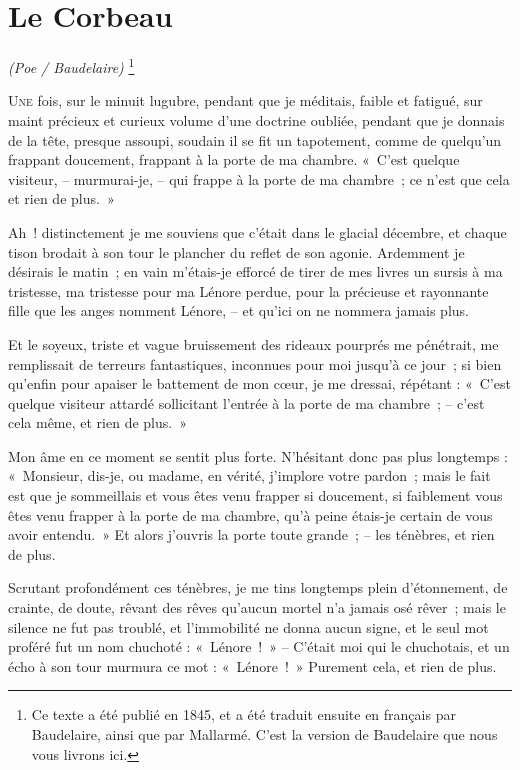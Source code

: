 \documentclass[openany]{book} %
\def\MYxFONT{\rm}   %
\begin{document}
\section{Le Corbeau}

\textit{(Poe / Baudelaire)} \footnote{\MYxFONT Ce texte a été publié en 1845, et a été traduit ensuite en français par Baudelaire, ainsi que par Mallarmé. C'est la version de Baudelaire que nous vous livrons ici.}

\bigskip


\lettrine[lines=\INITIALxLETTERxSIZE, lhang=0.33, loversize=0.25]{U}{ne} fois, sur le minuit lugubre, pendant que je méditais, faible et fatigué, sur maint précieux et curieux volume d’une doctrine oubliée, pendant que je donnais de la tête, presque assoupi, soudain il se fit un tapotement, comme de quelqu’un frappant doucement, frappant à la porte de ma chambre. «~C’est quelque visiteur, – murmurai-je, – qui frappe à la porte de ma chambre~; ce n’est que cela et rien de plus.~»

\bigskip
Ah~! distinctement je me souviens que c’était dans le glacial décembre, et chaque tison brodait à son tour le plancher du reflet de son agonie. Ardemment je désirais le matin~; en vain m’étais-je efforcé de tirer de mes livres un sursis à ma tristesse, ma tristesse pour ma Lénore perdue, pour la précieuse et rayonnante fille que les anges nomment Lénore, – et qu’ici on ne nommera jamais plus.

\bigskip
Et le soyeux, triste et vague bruissement des rideaux pourprés me pénétrait, me remplissait de terreurs fantastiques, inconnues pour moi jusqu’à ce jour~; si bien qu’enfin pour apaiser le battement de mon cœur, je me dressai, répétant : «~C’est quelque visiteur attardé sollicitant l’entrée à la porte de ma chambre~; – c’est cela même, et rien de plus.~»

\bigskip
Mon âme en ce moment se sentit plus forte. N’hésitant donc pas plus longtemps : «~Monsieur, dis-je, ou madame, en vérité, j’implore votre pardon~; mais le fait est que je sommeillais et vous êtes venu frapper si doucement, si faiblement vous êtes venu frapper à la porte de ma chambre, qu’à peine étais-je certain de vous avoir entendu.~» Et alors j’ouvris la porte toute grande~; – les ténèbres, et rien de plus.

\bigskip
Scrutant profondément ces ténèbres, je me tins longtemps plein d’étonnement, de crainte, de doute, rêvant des rêves qu’aucun mortel n’a jamais osé rêver~; mais le silence ne fut pas troublé, et l’immobilité ne donna aucun signe, et le seul mot proféré fut un nom chuchoté : «~Lénore~!~» – C’était moi qui le chuchotais, et un écho à son tour murmura ce mot : «~Lénore~!~» Purement cela, et rien de plus.
\end{document}
